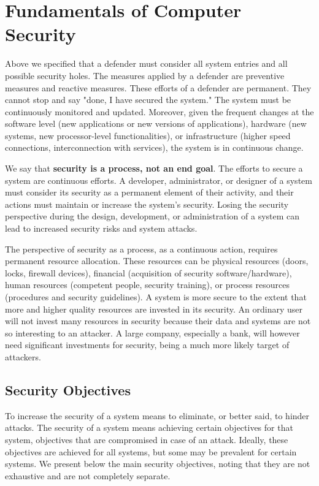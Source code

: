 \section{Fundamentals of Computer Security}
\label{sec:sec:fundamentals}

Above we specified that a defender must consider all system entries and all possible security holes.
The measures applied by a defender are preventive measures and reactive measures.
These efforts of a defender are permanent.
They cannot stop and say "done, I have secured the system."
The system must be continuously monitored and updated.
Moreover, given the frequent changes at the software level (new applications or new versions of applications), hardware (new systems, new processor-level functionalities), or infrastructure (higher speed connections, interconnection with services), the system is in continuous change.

We say that \textbf{security is a process, not an end goal}.
The efforts to secure a system are continuous efforts.
A developer, administrator, or designer of a system must consider its security as a permanent element of their activity, and their actions must maintain or increase the system's security.
Losing the security perspective during the design, development, or administration of a system can lead to increased security risks and system attacks.

The perspective of security as a process, as a continuous action, requires permanent resource allocation.
These resources can be physical resources (doors, locks, firewall devices), financial (acquisition of security software/hardware), human resources (competent people, security training), or process resources (procedures and security guidelines).
A system is more secure to the extent that more and higher quality resources are invested in its security.
An ordinary user will not invest many resources in security because their data and systems are not so interesting to an attacker.
A large company, especially a bank, will however need significant investments for security, being a much more likely target of attackers.

\subsection{Security Objectives}
\label{sec:sec:fundamentals:objectives}

To increase the security of a system means to eliminate, or better said, to hinder attacks.
The security of a system means achieving certain objectives for that system, objectives that are compromised in case of an attack.
Ideally, these objectives are achieved for all systems, but some may be prevalent for certain systems.
We present below the main security objectives, noting that they are not exhaustive and are not completely separate.

